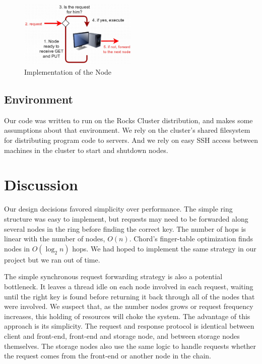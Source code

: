 \documentclass[11pt,conference]{IEEEtran}
\begin{document}
\begin{figure}[h!]
  \centering
    \includegraphics[width=0.5\textwidth]{node}
    \caption{Implementation of the Node}
    \label{fig:node}
\end{figure}


\subsection{Environment}

Our code was written to run on the Rocks Cluster distribution\cite{rocks}, and
makes some assumptions about that environment. We rely on the cluster's shared
filesystem for distributing program code to servers. And we rely on easy SSH
access between machines in the cluster to start and shutdown nodes.


\section{Discussion}

Our design decisions favored simplicity over performance. The simple ring
structure was easy to implement, but requests may need to be forwarded along
several nodes in the ring before finding the correct key. The number of hops is
linear with the number of nodes, $O(n)$. Chord's finger-table
optimization\cite{chord} finds nodes in $O(\log_2 n)$ hops. We had hoped to
implement the same strategy in our project but we ran out of time.

The simple synchronous request forwarding strategy is also a potential
bottleneck. It leaves a thread idle on each node involved in each request,
waiting until the right key is found before returning it back through all of the
nodes that were involved. We suspect that, as the number nodes grows or request
frequency increases, this holding of resources will choke the system. The
advantage of this approach is its simplicity. The request and response protocol
is identical between client and front-end, front-end and storage node, and
between storage nodes themselves. The storage nodes also use the same logic to
handle requests whether the request comes from the front-end or another node in
the chain.
\end{document}
